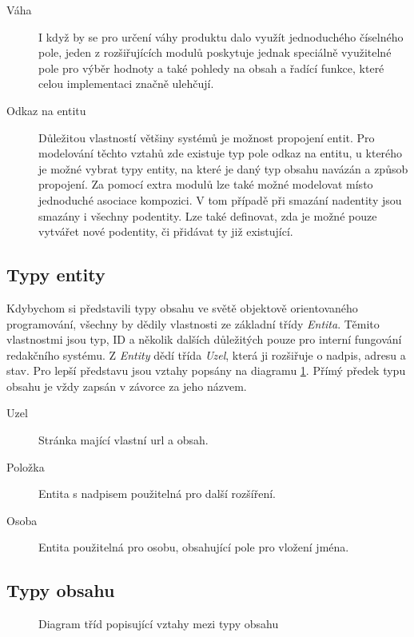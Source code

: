 \begin{description}
  \item[Váha] I když by se pro určení váhy produktu dalo využít jednoduchého číselného pole, jeden z rozšiřujících modulů poskytuje jednak speciálně využitelné pole pro výběr hodnoty a také pohledy na obsah a řadící funkce, které celou implementaci značně ulehčují.
  
  \item[Odkaz na entitu] Důležitou vlastností většiny systémů je možnost propojení entit. Pro modelování těchto vztahů zde existuje typ pole odkaz na entitu, u kterého je možné vybrat typy entity, na které je daný typ obsahu navázán a způsob propojení. Za pomocí extra modulů lze také možné modelovat místo jednoduché asociace kompozici. V tom případě při smazání nadentity jsou smazány i všechny podentity. Lze také definovat, zda je možné pouze vytvářet nové podentity, či přidávat ty již existující.
\end{description}

\subsection{Typy entity}
\label{subsec:typy-entiy}
Kdybychom si představili typy obsahu ve světě objektově orientovaného programování, všechny by dědily vlastnosti ze základní třídy \emph{Entita}. Těmito vlastnostmi jsou typ, ID a několik dalších důležitých pouze pro interní fungování redakčního systému. Z \emph{Entity} dědí třída \emph{Uzel}, která ji rozšiřuje o nadpis, adresu a stav. Pro lepší představu jsou vztahy popsány na diagramu \ref{fig:class-diagram}. Přímý předek typu obsahu je vždy zapsán v závorce za jeho názvem.

\begin{description}
  \item[Uzel] Stránka mající vlastní \gls{url} a obsah.
  \item[Položka] Entita s nadpisem použitelná pro další rozšíření.
  \item[Osoba] Entita použitelná pro osobu, obsahující pole pro vložení jména.
\end{description}

\subsection{Typy obsahu}
\label{subsec:typy-obsahu}

\begin{figure}[htp] 
\caption{Diagram tříd popisující vztahy mezi typy obsahu}
\label{fig:class-diagram}
\end{figure}  

